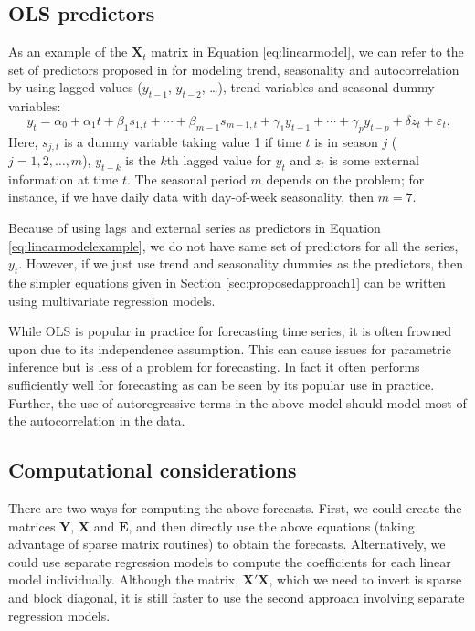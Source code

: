 \documentclass[11pt,a4paper,]{article}
\begin{document}
\hypertarget{ols-predictors}{%
\subsection{OLS predictors}\label{ols-predictors}}

As an example of the \(\bm{X}_t\) matrix in Equation
\eqref{eq:linearmodel}, we can refer to the set of predictors proposed in
\textcite{ashouri2018} for modeling trend, seasonality and
autocorrelation by using lagged values (\(y_{t-1}\), \(y_{t-2}\),
\dots), trend variables and seasonal dummy variables:
\begin{equation}\label{eq:linearmodelexample}
   y_t = \alpha_0 + \alpha_1 t + \beta_1 s_{1,t} + \cdots + \beta_{m-1} s_{m-1,t} + \gamma_1 y_{t-1} + \cdots + \gamma_p y_{t-p} + \delta z_t + \varepsilon_t.
\end{equation} Here, \(s_{j,t}\) is a dummy variable taking value 1 if
time \(t\) is in season \(j\) (\(j=1, 2, \dots, m\)), \(y_{t-k}\) is the
\(k\)th lagged value for \(y_t\) and \(z_t\) is some external
information at time \(t\). The seasonal period \(m\) depends on the
problem; for instance, if we have daily data with day-of-week
seasonality, then \(m=7\).

Because of using lags and external series as predictors in Equation
\eqref{eq:linearmodelexample}, we do not have same set of predictors for
all the series, \(y_t\). However, if we just use trend and seasonality
dummies as the predictors, then the simpler equations given in Section
\ref{sec:proposedapproach1} can be written using multivariate regression
models.

While OLS is popular in practice for forecasting time series, it is
often frowned upon due to its independence assumption. This can cause
issues for parametric inference but is less of a problem for
forecasting. In fact it often performs sufficiently well for forecasting
as can be seen by its popular use in practice. Further, the use of
autoregressive terms in the above model should model most of the
autocorrelation in the data.

\hypertarget{computational-considerations}{%
\subsection{\texorpdfstring{Computational considerations
\label{sec:computationalconsiderations}}{Computational considerations }}\label{computational-considerations}}

There are two ways for computing the above forecasts. First, we could
create the matrices \(\bm{Y}\), \(\bm{X}\) and \(\bm{E}\), and then
directly use the above equations (taking advantage of sparse matrix
routines) to obtain the forecasts. Alternatively, we could use separate
regression models to compute the coefficients for each linear model
individually. Although the matrix, \(\bm{X}'\bm{X}\), which we need to
invert is sparse and block diagonal, it is still faster to use the
second approach involving separate regression models.
\end{document}
